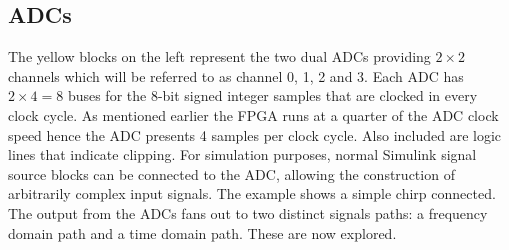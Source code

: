 
\subsection{ADCs}
The yellow blocks on the left represent the two dual ADCs providing \(2 \times 2\) channels which will be referred to as channel 0, 1, 2 and 3. Each ADC has \(2 \times 4 = 8\) buses for the 8-bit signed integer samples that are clocked in every clock cycle. As mentioned earlier the FPGA runs at a quarter of the ADC clock speed hence the ADC presents 4 samples per clock cycle.  Also included are logic lines that indicate clipping. For simulation purposes, normal Simulink signal source blocks can be connected to the ADC, allowing the construction of arbitrarily complex input signals. The example shows a simple chirp connected. The output from the ADCs fans out to two distinct signals paths: a frequency domain path and a time domain path. These are now explored.

